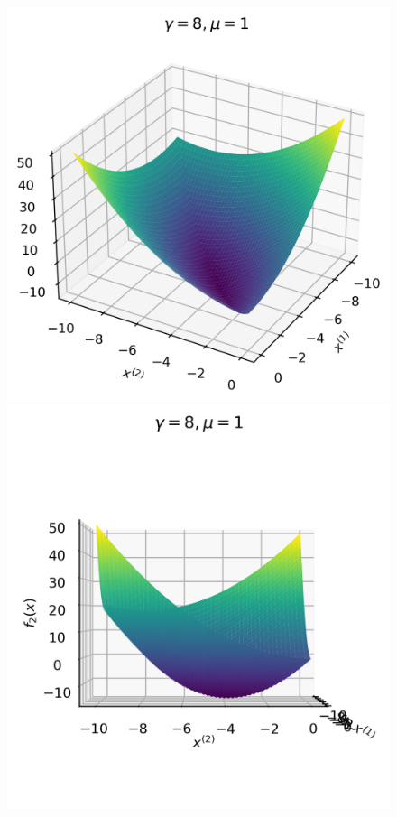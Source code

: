 \documentclass[a4paper, 14pt, dvipdfmx]{extarticle}
\begin{document}
\begin{figure}[H]
    \begin{minipage}{0.49\columnwidth}
        \centering
        \includegraphics[width=\columnwidth]{fk.png}
    \end{minipage}
    \begin{minipage}{0.49\columnwidth}
        \centering
        \includegraphics[width=\columnwidth]{fk2.png}
    \end{minipage}
\end{figure}
\end{document}

